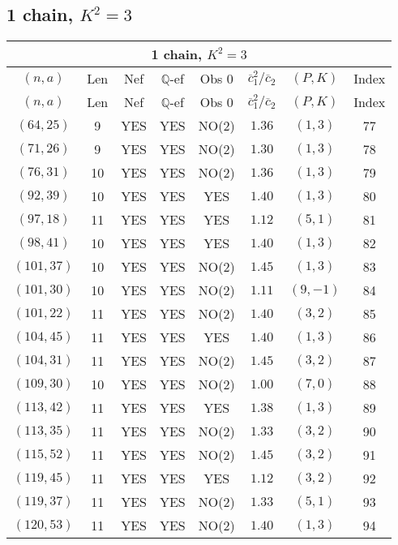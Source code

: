\subsection{1 chain, $K^2 = 3$}
\begin{longtable}{|c|c|c|c|c|c|c|c|}
\hline
\multicolumn{8}{|c|}{1 chain, $K^2 = 3$}\\
\hline
$(n,a)$ & Len & Nef & $\mathbb Q$-ef & Obs 0 & $\overline c_1^2 / \overline c_2$ & $(P,K)$ & Index\\
\hline
\endfirsthead

\hline
$(n,a)$ & Len & Nef & $\mathbb Q$-ef & Obs 0 & $\overline c_1^2 / \overline c_2$ & $(P,K)$ & Index\\
\hline
\endhead
\hline
\endfoot

$(64,25)$ & 9 & YES & YES & NO(2) & $1.36$ & $(1,3)$ & 77\\
$(71,26)$ & 9 & YES & YES & NO(2) & $1.30$ & $(1,3)$ & 78\\
$(76,31)$ & 10 & YES & YES & NO(2) & $1.36$ & $(1,3)$ & 79\\
$(92,39)$ & 10 & YES & YES & YES & $1.40$ & $(1,3)$ & 80\\
$(97,18)$ & 11 & YES & YES & YES & $1.12$ & $(5,1)$ & 81\\
$(98,41)$ & 10 & YES & YES & YES & $1.40$ & $(1,3)$ & 82\\
$(101,37)$ & 10 & YES & YES & NO(2) & $1.45$ & $(1,3)$ & 83\\
$(101,30)$ & 10 & YES & YES & NO(2) & $1.11$ & $(9,-1)$ & 84\\
$(101,22)$ & 11 & YES & YES & NO(2) & $1.40$ & $(3,2)$ & 85\\
$(104,45)$ & 11 & YES & YES & YES & $1.40$ & $(1,3)$ & 86\\
$(104,31)$ & 11 & YES & YES & NO(2) & $1.45$ & $(3,2)$ & 87\\
$(109,30)$ & 10 & YES & YES & NO(2) & $1.00$ & $(7,0)$ & 88\\
$(113,42)$ & 11 & YES & YES & YES & $1.38$ & $(1,3)$ & 89\\
$(113,35)$ & 11 & YES & YES & NO(2) & $1.33$ & $(3,2)$ & 90\\
$(115,52)$ & 11 & YES & YES & NO(2) & $1.45$ & $(3,2)$ & 91\\
$(119,45)$ & 11 & YES & YES & YES & $1.12$ & $(3,2)$ & 92\\
$(119,37)$ & 11 & YES & YES & NO(2) & $1.33$ & $(5,1)$ & 93\\
$(120,53)$ & 11 & YES & YES & NO(2) & $1.40$ & $(1,3)$ & 94\\

\end{longtable}
